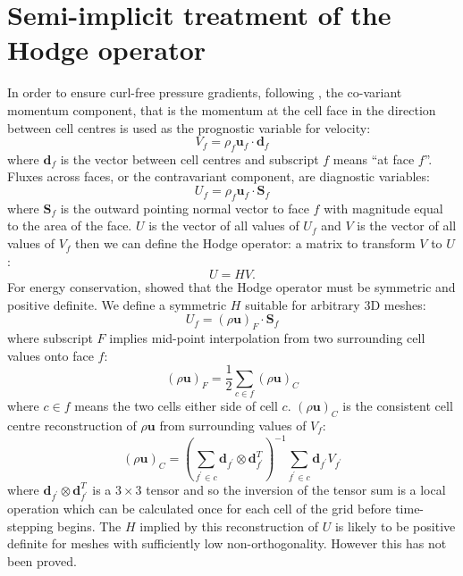 \section{Semi-implicit treatment of the Hodge operator\label{appx:SI}}

In order to ensure curl-free pressure gradients, following \citet{weller-shahrokhi2014},
the co-variant momentum component, that is the momentum at the cell
face in the direction between cell centres is used as the prognostic
variable for velocity:
\begin{equation}
V_{f}=\rho_{f}\mathbf{u}_{f}\cdot\mathbf{d}_{f}
\end{equation}
where $\mathbf{d}_{f}$ is the vector between cell centres and subscript
$f$ means ``at face $f$''. Fluxes across faces, or the contravariant
component, are diagnostic variables:
\begin{equation}
U_{f}=\rho_{f}\mathbf{u}_{f}\cdot\mathbf{S}_{f}
\end{equation}
where $\mathbf{S}_{f}$ is the outward pointing normal vector to face
$f$ with magnitude equal to the area of the face. $U$ is the vector
of all values of $U_{f}$ and $V$ is the vector of all values of
$V_{f}$ then we can define the Hodge operator: a matrix to transform
$V$ to $U$:
\begin{equation}
U=HV.
\end{equation}
For energy conservation, \citet{TC12} showed that the Hodge operator
must be symmetric and positive definite. We define a symmetric $H$
suitable for arbitrary 3D meshes:
\begin{equation}
U_{f}=(\rho\mathbf{u})_{F}\cdot\mathbf{S}_{f}
\end{equation}
where subscript $F$ implies mid-point interpolation from two surrounding
cell values onto face $f$:
\begin{equation}
(\rho\mathbf{u})_{F}=\frac{1}{2}\sum_{c\in f}(\rho\mathbf{u})_{C}
\end{equation}
where $c\in f$ means the two cells either side of cell $c$. $(\rho\mathbf{u})_{C}$
is the consistent cell centre reconstruction of $\rho\mathbf{u}$
from surrounding values of $V_{f}$:
\[
(\rho\mathbf{u})_{C}=\left(\sum_{f^{\prime}\in c}\mathbf{d}_{f^{\prime}}\otimes\mathbf{d}_{f^{\prime}}^{T}\right)^{-1}\sum_{f^{\prime}\in c}\mathbf{d}_{f^{\prime}}V_{f^{\prime}}
\]
where $\mathbf{d}_{f^{\prime}}\otimes\mathbf{d}_{f^{\prime}}^{T}$
is a $3\times3$ tensor and so the inversion of the tensor sum is
a local operation which can be calculated once for each cell of the
grid before time-stepping begins. The $H$ implied by this reconstruction
of $U$ is likely to be positive definite for meshes with sufficiently
low non-orthogonality. However this has not been proved. 

